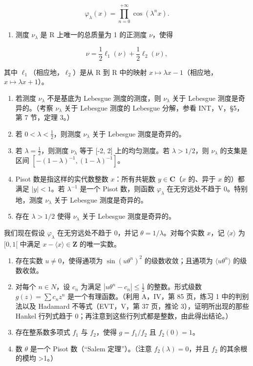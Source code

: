 \[
\varphi_ {\lambda} (x) = \prod_ {n = 0} ^ {+ \infty} \cos (\lambda^ {n} x).
\]

\begin{enumerate}
\def\labelenumi{\alph{enumi})}
\setcounter{enumi}{1}
\tightlist
\item
  测度 \(\nu_{\lambda}\) 是 R 上唯一的总质量为 1 的正测度 \(\nu\)，使得
\end{enumerate}

\[
\nu = \frac {1}{2} \ell_ {1} (\nu) + \frac {1}{2} \ell_ {2} (\nu),
\]

其中 \(\ell_{1}\)（相应地，\(\ell_{2}\)）是从 R 到 R 中的映射 \(x \mapsto \lambda x - 1\)（相应地，\(x \mapsto \lambda x + 1\)）。

\begin{enumerate}
\def\labelenumi{\alph{enumi})}
\setcounter{enumi}{2}
\item
  若测度 \(\nu_{\lambda}\) 不是基底为 Lebesgue 测度的测度，则 \(\nu_{\lambda}\) 关于 Lebesgue 测度是奇异的。（考察 \(\nu_{\lambda}\) 关于 Lebesgue 测度的 Lebesgue 分解，参看 INT，V，§5，第 7 节，定理 3。）
\item
  若 \(0 < \lambda < \frac{1}{2}\)，则测度 \(\nu_{\lambda}\) 关于 Lebesgue 测度是奇异的。
\item
  若 \(\lambda = \frac{1}{2}\)，则测度 \(\nu_{\lambda}\) 等于 {[}-2, 2{]} 上的均匀测度。若 \(\lambda > 1/2\)，则 \(\nu_{\lambda}\) 的支集是区间 \([-(1-\lambda)^{-1}, (1-\lambda)^{-1}]\)。
\item
  Pisot 数是指这样的实代数整数 \(x\)：所有共轭数 \(y \in \mathbf{C}\)（\(x\) 的、异于 \(x\) 的）都满足 \(|y| < 1\)。若 \(\lambda^{-1}\) 是一个 Pisot 数，则函数 \(\varphi_{\lambda}\) 在无穷远处不趋于 0。特别地，测度 \(\nu_{\lambda}\) 关于 Lebesgue 测度是奇异的。
\item
  存在 \(\lambda > 1/2\) 使得 \(\nu_{\lambda}\) 关于 Lebesgue 测度是奇异的。
\end{enumerate}
\relax{}
我们现在假设 \(\varphi_{\lambda}\) 在无穷远处不趋于 0，并记 \(\theta = 1 / \lambda\)。对每个实数 \(x\)，记 \(\langle x\rangle\) 为 \([0,1[\) 中满足 \(x - \langle x\rangle \in \mathbf{Z}\) 的唯一实数。

\begin{enumerate}
\def\labelenumi{\alph{enumi})}
\setcounter{enumi}{7}
\item
  存在实数 \(u \neq 0\)，使得通项为 \(\sin(u\theta^{n})^{2}\) 的级数收敛；且通项为 \(\langle u\theta^{n}\rangle\) 的级数收敛。
\item
  对每个 \(n \in N\)，设 \(c_{n}\) 为满足 \(|u\theta^{n} - c_{n}| \leqslant \frac{1}{2}\) 的整数。形式级数 \(g(z) = \sum c_{n}z^{n}\) 是一个有理函数。（利用 A，IV，第 85 页，练习 1 中的判别法以及 Hadamard 不等式（EVT，V，第 37 页，推论 3），证明所出现的那些 Hankel 行列式趋于 0；再注意到这些行列式都是整数，由此得出结论。）
\item
  存在整系数多项式 \(f_1\) 与 \(f_2\)，使得 \(g = f_1 / f_2\) 且 \(f_2(0) = 1\)。
\item
  数 \(\theta\) 是一个 Pisot 数（“Salem 定理”）。（注意 \(f_{2}(\lambda)=0\)，并且 \(f_{2}\) 的其余根的模均 \textgreater1。）
\end{enumerate}

